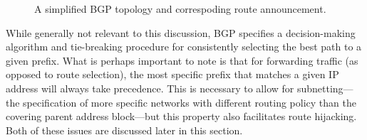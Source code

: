 \begin{figure}
\begin{centering}
\caption{A simplified BGP topology and correspoding route announcement.}
\label{fig:bgp_announcement}
\end{centering}
\end{figure}


While generally not relevant to this discussion, BGP specifies a decision-making algorithm and tie-breaking procedure for consistently selecting the best path to a given prefix. What is perhaps important to note is that for forwarding traffic (as opposed to route selection), the most specific prefix that matches a given IP address will always take precedence. This is necessary to allow for subnetting---the specification of more specific networks with different routing policy than the covering parent address block---but this property also facilitates route hijacking. Both of these issues are discussed later in this section.

